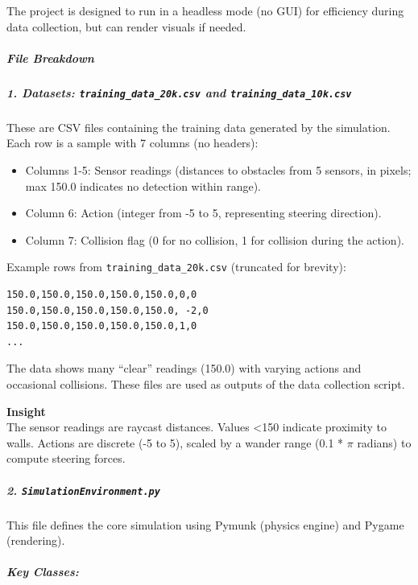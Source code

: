 The project is designed to run in a headless mode (no GUI) for efficiency during data collection, but can render visuals if needed.

\subparagraph{File Breakdown}

\subparagraph{1. Datasets: \texttt{training\_data\_20k.csv} and \texttt{training\_data\_10k.csv}}

These are CSV files containing the training data generated by the simulation. Each row is a sample with 7 columns (no headers):

\begin{itemize}
\item Columns 1-5: Sensor readings (distances to obstacles from 5 sensors, in pixels; max 150.0 indicates no detection within range).
\item Column 6: Action (integer from -5 to 5, representing steering direction).
\item Column 7: Collision flag (0 for no collision, 1 for collision during the action).
\end{itemize}

Example rows from \texttt{training\_data\_20k.csv} (truncated for brevity):

\begin{verbatim}
150.0,150.0,150.0,150.0,150.0,0,0
150.0,150.0,150.0,150.0,150.0, -2,0
150.0,150.0,150.0,150.0,150.0,1,0
...
\end{verbatim}

The data shows many ``clear'' readings (150.0) with varying actions and occasional collisions. These files are used as outputs of the data collection script.

\begin{framed}
\textbf{Insight}\\
The sensor readings are raycast distances. Values \textless 150 indicate proximity to walls. Actions are discrete (-5 to 5), scaled by a wander range (0.1 * $\pi$ radians) to compute steering forces.
\end{framed}

\subparagraph{2. \texttt{SimulationEnvironment.py}}

This file defines the core simulation using Pymunk (physics engine) and Pygame (rendering).

\subparagraph{Key Classes:}

